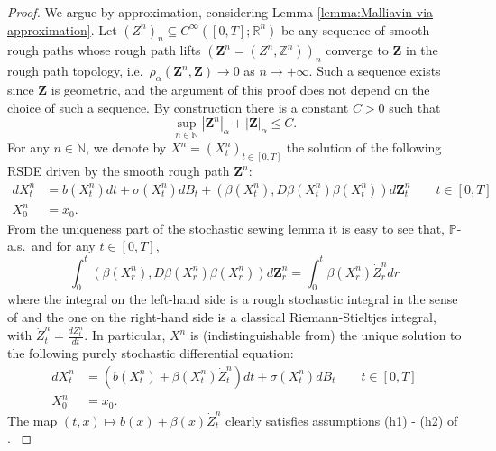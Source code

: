 \documentclass[11pt,a4paper]{article}
\newcommand{\R}{\mathbb{R}}
\theoremstyle{plain}
\begin{document}
\begin{proof}
    We argue by approximation, considering Lemma \ref{lemma:Malliavin via approximation}. Let $(Z^n)_n \subseteq C^\infty([0,T];\R^n)$ be any sequence of smooth rough paths whose rough path lifts $(\mathbf{Z}^n=(Z^n,\mathbb{Z}^n))_n $ converge to $\mathbf{Z}$ in the rough path topology, i.e.\ $\rho_\alpha(\mathbf{Z}^n,\mathbf{Z}) \to 0$ as $n \to +\infty$. Such a sequence exists since $\mathbf{Z}$ is geometric, and the argument of this proof does not depend on the choice of such a sequence. By construction there is a constant $C>0$ such that \begin{equation} \label{eq:constantC}
    \sup_{n \in \mathbb{N}} |\mathbf{Z}^n|_\alpha  + |\mathbf{Z}|_\alpha  \le C.
    \end{equation} 
    For any $n \in \mathbb{N}$, we denote by $X^n=(X^n_t)_{t \in [0,T]}$ the solution of the following RSDE driven by the smooth rough path $\mathbf{Z}^n$: \begin{equation}  \label{eq:approximatingsolutionRSDE}\begin{aligned} dX^n_t&=b(X^n_t)dt+\sigma(X^n_t)dB_t+(\beta(X^n_t),D\beta(X^n_t)\beta(X^n_t))d\mathbf{Z}^n_t \qquad t \in [0,T] \\ X^n_0&=x_0.\end{aligned}
    \end{equation} 
    {
    From the uniqueness part of the stochastic sewing lemma \cite[Theorem 2.9]{FHL21} it is easy to see that, $\mathbb{P}$-a.s.\ and for any $t \in [0,T]$, \begin{equation*}
        \int_0^t (\beta(X^n_r),D\beta(X^n_r)\beta(X^n_r))d\mathbf{Z}^n_r = \int_0^t \beta(X^n_r) \dot{Z}^n_r dr
    \end{equation*}
    where the integral on the left-hand side is a rough stochastic integral in the sense of \cite{FHL21} and the one on the right-hand side is a classical Riemann-Stieltjes integral, with $\dot{Z}^n_t = \frac{d Z^n_t}{dt}$.
    In particular, $X^n$ is (indistinguishable from) the unique solution to the following purely stochastic differential equation: 
    \begin{equation*}  %
    \begin{aligned} dX^n_t&=(b(X^n_t) + \beta(X^n_t) \dot{Z}^n_t)dt+\sigma(X^n_t)dB_t \qquad t \in [0,T] \\ X^n_0&=x_0.\end{aligned}
    \end{equation*} 
    The map $(t,x) \mapsto b(x) + \beta(x) \dot{Z}^n_t$ clearly satisfies assumptions (h1) - (h2) of \cite[Section~2.2]{nualart2006malliavin}. 
}
\end{proof}
\end{document}

